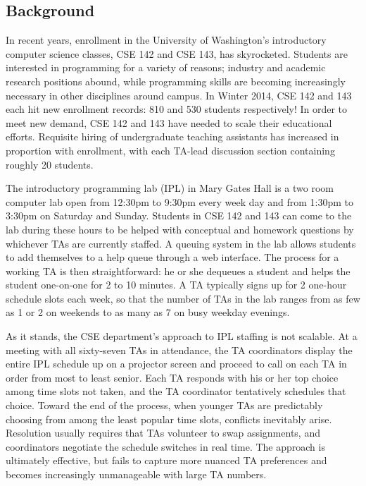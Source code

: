 \documentclass{article}
\begin{document}
\setlength\columnsep{0.45in}
\setlength{\parskip}{0.5em}
\begin{multicols}{2}

\section*{Background}

In recent years, enrollment in the University of Washington's introductory computer science classes, CSE 142 and CSE 143, has skyrocketed. Students are interested in programming for a variety of reasons; industry and academic research positions abound, while programming skills are becoming increasingly necessary in other disciplines around campus. In Winter 2014, CSE 142 and 143 each hit new enrollment records: 810 and 530 students respectively! In order to meet new demand, CSE 142 and 143 have needed to scale their educational efforts. Requisite hiring of undergraduate teaching assistants has increased in proportion with enrollment, with each TA-lead discussion section containing roughly 20 students.

The introductory programming lab (IPL) in Mary Gates Hall is a two room computer lab open from 12:30pm to 9:30pm every week day and from 1:30pm to 3:30pm on Saturday and Sunday. Students in CSE 142 and 143 can come to the lab during these hours to be helped with conceptual and homework questions by whichever TAs are currently staffed. A queuing system in the lab allows students to add themselves to a help queue through a web interface. The process for a working TA is then straightforward: he or she dequeues a student and helps the student one-on-one for 2 to 10 minutes. A TA typically signs up for 2 one-hour schedule slots each week, so that the number of TAs in the lab ranges from as few as 1 or 2 on weekends to as many as 7 on busy weekday evenings.

As it stands, the CSE department's approach to IPL staffing is not scalable. At a meeting with all sixty-seven TAs in attendance, the TA coordinators display the entire IPL schedule up on a projector screen and proceed to call on each TA in order from most to least senior. Each TA responds with his or her top choice among time slots not taken, and the TA coordinator tentatively schedules that choice. Toward the end of the process, when younger TAs are predictably choosing from among the least popular time slots, conflicts inevitably arise. Resolution usually requires that TAs volunteer to swap assignments, and coordinators negotiate the schedule switches in real time. The approach is ultimately effective, but fails to capture more nuanced TA preferences and becomes increasingly unmanageable with large TA numbers.


\end{multicols}
\end{document}
